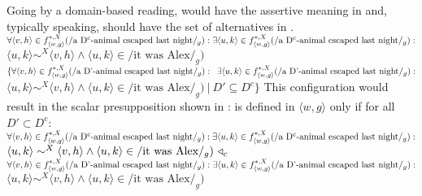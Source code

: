 Going by a domain-based reading,  would have the assertive meaning in  and, typically speaking, should have the set of alternatives in .
\pex[nopreamble=true]%
\a{} {}\\$\forall{\langle v,h\rangle\in f^{*,X}_{\langle w,g\rangle}(/\text{a D\textsuperscript{c}-animal escaped last night}/_g)}:\\\exists\langle u,k\rangle\in f^{*,X}_{\langle w,g\rangle}(/\text{a D\textsuperscript{c}-animal escaped last night}/_g):$\\\emptyfill$\langle u,k\rangle\sim^X\langle v,h\rangle\land\langle u,k\rangle\in/\text{it was Alex}/_g)$
\a{} {}\\$\{\forall{\langle v,h\rangle\in f^{*,X}_{\langle w,g\rangle}(/\text{a D'-animal escaped last night}/_g)}:\\\phantom{\{}\exists\langle u,k\rangle\in f^{*,X}_{\langle w,g\rangle}(/\text{a D'-animal escaped last night}/_g):$\\\emptyfill$\langle u,k\rangle\sim^X\langle v,h\rangle\land\langle u,k\rangle\in/\text{it was Alex}/_g)~|~D'\subseteq D^c\}$
\xe
This configuration would result in the scalar presupposition shown in :
\ex{}
{}\linebreak
is defined in $\langle w,g\rangle$ only if for all $D'\subset D^c$:\\
$\forall{\langle v,h\rangle\in f^{*,X}_{\langle w,g\rangle}(/\text{a D\textsuperscript{c}-animal escaped last night}/_g)}:\\\exists\langle u,k\rangle\in f^{*,X}_{\langle w,g\rangle}(/\text{a D\textsuperscript{c}-animal escaped last night}/_g):$\\\emptyfill$\langle u,k\rangle\sim^X\langle v,h\rangle\land\langle u,k\rangle\in/\text{it was Alex}/_g)~\triangleleft_c$\\
$\forall{\langle v,h\rangle\in f^{*,X}_{\langle w,g\rangle}(/\text{a D'-animal escaped last night}/_g)}:\\\exists\langle u,k\rangle\in f^{*,X}_{\langle w,g\rangle}(/\text{a D'-animal escaped last night}/_g):$\\\emptyfill$\langle u,k\rangle\sim^X\langle v,h\rangle\land\langle u,k\rangle\in/\text{it was Alex}/_g)$
